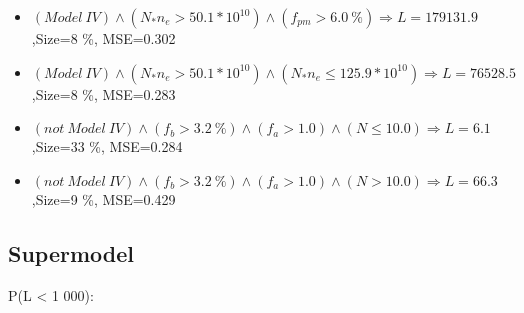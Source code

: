 \documentclass[numbered]{CSL}
\begin{document}
\begin{itemize}
\item $(Model~IV) \land (N_* n_e > 50.1 * 10^{10}) \land (f_{pm} > 6.0~\%) \Rightarrow L = 179131.9$,\hfill Size=8 \%, MSE=0.302
\item $(Model~IV) \land (N_* n_e > 50.1 * 10^{10}) \land (N_* n_e \leq 125.9 * 10^{10}) \Rightarrow L = 76528.5$,\hfill Size=8 \%, MSE=0.283
\item $(not~Model~IV) \land (f_b > 3.2~\%) \land (f_a > 1.0) \land (N \leq 10.0) \Rightarrow L = 6.1$,\hfill Size=33 \%, MSE=0.284
\item $(not~Model~IV) \land (f_b > 3.2~\%) \land (f_a > 1.0) \land (N > 10.0) \Rightarrow L = 66.3$,\hfill Size=9 \%, MSE=0.429
\end{itemize}

\subsection{Supermodel}
P(L < 1 000):
\end{document}
